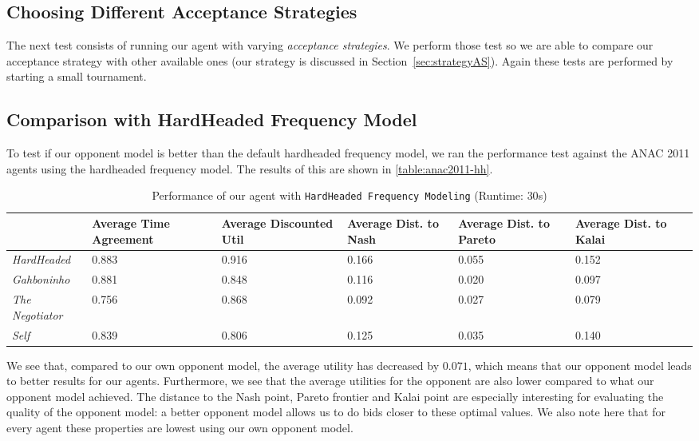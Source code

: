 
\subsection{Choosing Different Acceptance Strategies}

The next test consists of running our agent with varying \emph{acceptance strategies}. We perform those test so we are able to compare our acceptance strategy with other available ones (our strategy is discussed in Section~\ref{sec:strategyAS}). Again these tests are performed by starting a small tournament. \\


\subsection{Comparison with HardHeaded Frequency Model}
To test if our opponent model is better than the default hardheaded frequency model, we ran the performance test against the ANAC 2011 agents using the hardheaded frequency model. The results of this are shown in \autoref{table:anac2011-hh}.
\begin{table}[H]
	\centering
	\small
    \begin{tabular}{l|p{2cm}|p{2cm}|p{2cm}|p{2cm}|p{2cm}|p{2cm}|}
    ~              & Average Time Agreement & Average Discounted Util & Average Dist. to Nash & Average Dist. to Pareto & Average Dist. to Kalai \\
    \hline
    \emph{HardHeaded}		& 0.883  & 0.916  & 0.166  & 0.055  & 0.152   \\ \hline
    \emph{Gahboninho}   	& 0.881  & 0.848  & 0.116  & 0.020  & 0.097   \\ \hline
    \emph{The Negotiator} 	& 0.756  & 0.868  & 0.092  & 0.027  & 0.079   \\ \hline
    \emph{Self}             & 0.839  & 0.806  & 0.125  & 0.035  & 0.140   \\ \hline
    \end{tabular}
    \caption{Performance of our agent with \texttt{HardHeaded Frequency Modeling} (Runtime: $30$s) \label{table:anac2011-hh}}
\end{table}
We see that, compared to our own opponent model, the average utility has decreased by $0.071$, which means that our opponent model leads to  better results for our agents. 
Furthermore, we see that the average utilities for the opponent are also lower compared to what our opponent model achieved.
The distance to the Nash point, Pareto frontier and Kalai point are especially interesting for evaluating the quality of the opponent model: a better opponent model allows us to do bids closer to these optimal values. We also note here that for every agent these properties are lowest using our own opponent model.

